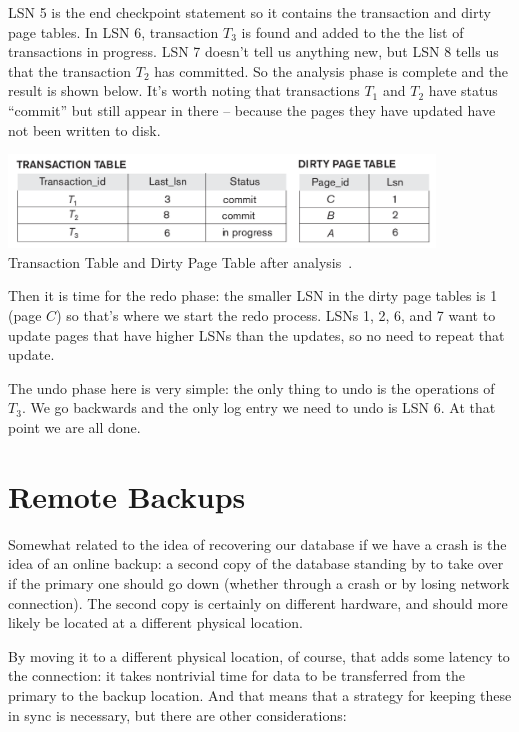 LSN 5 is the end checkpoint statement so it contains the transaction and dirty page tables. In LSN 6, transaction $T_{3}$ is found and added to the the list of transactions in progress. LSN 7 doesn't tell us anything new, but LSN 8 tells us that the transaction $T_{2}$ has committed. So the analysis phase is complete and the result is shown below. It's worth noting that transactions $T_{1}$ and $T_{2}$ have status ``commit'' but still appear in there -- because the pages they have updated have not been written to disk. 

\begin{center}
\includegraphics[width=0.85\textwidth]{images/aries-3}\\
Transaction Table and Dirty Page Table after analysis~\cite{fds}.
\end{center}

Then it is time for the redo phase: the smaller LSN in the dirty page tables is 1 (page $C$) so that's where we start the redo process. LSNs 1, 2, 6, and 7 want to update pages that have higher LSNs than the updates, so no need to repeat that update.

The undo phase here is very simple: the only thing to undo is the operations of $T_{3}$. We go backwards and the only log entry we need to undo is LSN 6. At that point we are all done.


\section*{Remote Backups}

Somewhat related to the idea of recovering our database if we have a crash is the idea of an online backup: a second copy of the database standing by to take over if the primary one should go down (whether through a crash or by losing network connection). The second copy is certainly on different hardware, and should more likely be located at a different physical location. 

By moving it to a different physical location, of course, that adds some latency to the connection: it takes nontrivial time for data to be transferred from the primary to the backup location. And that means that a strategy for keeping these in sync is necessary, but there are other considerations:

